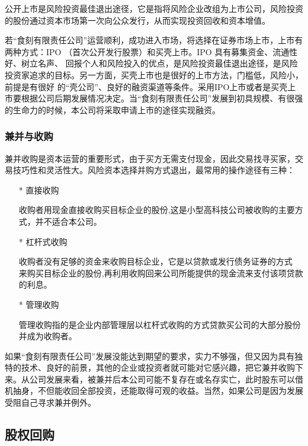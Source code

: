 \documentclass[UTF8,12pt]{ctexart}
\numberwithin{figure}{section}%
\begin{document}
\begin{spacing}{2}
公开上市是风险投资最佳退出途径，它是指将风险企业改组为上市公司，风险投资的股份通过资本市场第一次向公众发行，从而实现投资回收和资本增值。 
 
若“食刻有限责任公司”运营顺利，成功进入市场，将选择在证券市场上市，上市有两种方式：IPO （首次公开发行股票）和买壳上市。IPO 具有募集资金、流通性好、树立名声、 回报个人和风险投入的优点，是风险投资最佳退出途径，是风险投资家追求的目标。另一方面，买壳上市也是很好的上市方法，门槛低，风险小，前提是有很好 的“壳公司”、良好的融资渠道等条件。采用IPO上市或者是买壳上市要根据公司后期发展情况决定。当“食刻有限责任公司”发展到初具规模、有很强的生命力的时候，本公司将采取申请上市的途径实现融资。

\subsubsection{兼并与收购 }

兼并收购是资本运营的重要形式，由于买方无需支付现金，因此交易找寻买家，交易技巧性和灵活性大。风险资本选择并购方式退出，最常用的操作途径有三种：

\begin{itemize}
	\item[*] 直接收购
	
	收购者用现金直接收购买目标企业的股份,这是小型高科技公司被收购的主要方式，并不适合本公司。
	
	\item[*]杠杆式收购
	
	收购者没有足够的资金来收购目标企业，它是以贷款或发行债务证券的方式 来购买目标企业的股份,再利用收购回来公司所能提供的现金流来支付该项贷款 的利息。
	
	\item[*]管理收购
	
	管理收购指的是企业内部管理层以杠杆式收购的方式贷款买公司的大部分股份并成为收购者。
	
\end{itemize}

如果“食刻有限责任公司”发展没能达到期望的要求，实力不够强，但又因为具有独特的技术、良好的前景，其他的企业或投资者就可能对它感兴趣，把它兼并收购下来。从公司发展来看，被兼并后本公司可能不复存在或名存实亡，此时股东可以借机抽身，不但能收回全部投资，还能取得可观的收益。当然，如果公司是因为发展受阻自己寻求兼并例外。

\subsection{股权回购}


\end{spacing}
\end{document}
